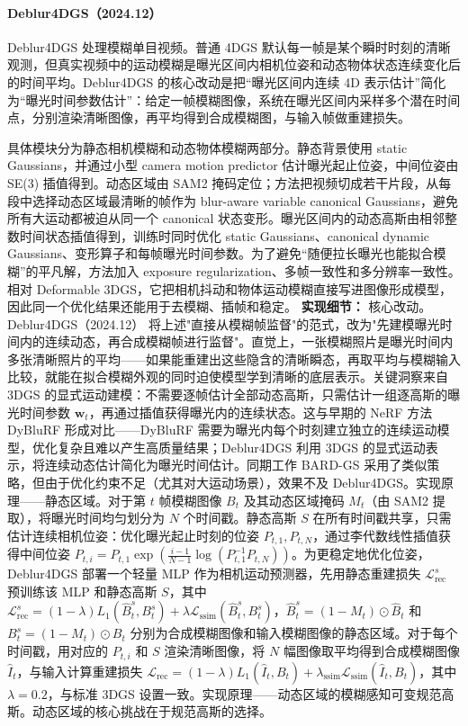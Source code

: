 \paragraph{Deblur4DGS（2024.12）\cite{2412_06424}}
Deblur4DGS 处理模糊单目视频。普通 4DGS 默认每一帧是某个瞬时时刻的清晰观测，但真实视频中的运动模糊是曝光区间内相机位姿和动态物体状态连续变化后的时间平均。Deblur4DGS 的核心改动是把“曝光区间内连续 4D 表示估计”简化为“曝光时间参数估计”：给定一帧模糊图像，系统在曝光区间内采样多个潜在时间点，分别渲染清晰图像，再平均得到合成模糊图，与输入帧做重建损失。

具体模块分为静态相机模糊和动态物体模糊两部分。静态背景使用 static Gaussians，并通过小型 camera motion predictor 估计曝光起止位姿，中间位姿由 SE(3) 插值得到。动态区域由 SAM2 掩码定位；方法把视频切成若干片段，从每段中选择动态区域最清晰的帧作为 blur-aware variable canonical Gaussians，避免所有大运动都被迫从同一个 canonical 状态变形。曝光区间内的动态高斯由相邻整数时间状态插值得到，训练时同时优化 static Gaussians、canonical dynamic Gaussians、变形算子和每帧曝光时间参数。为了避免“随便拉长曝光也能拟合模糊”的平凡解，方法加入 exposure regularization、多帧一致性和多分辨率一致性。相对 Deformable 3DGS，它把相机抖动和物体运动模糊直接写进图像形成模型，因此同一个优化结果还能用于去模糊、插帧和稳定。
\textbf{实现细节：} 核心改动。Deblur4DGS（2024.12） 将上述"直接从模糊帧监督"的范式，改为"先建模曝光时间内的连续动态，再合成模糊帧进行监督"。直觉上，一张模糊照片是曝光时间内多张清晰照片的平均——如果能重建出这些隐含的清晰瞬态，再取平均与模糊输入比较，就能在拟合模糊外观的同时迫使模型学到清晰的底层表示。关键洞察来自 3DGS 的显式运动建模：不需要逐帧估计全部动态高斯，只需估计一组逐高斯的曝光时间参数 $\mathbf{w}_t$，再通过插值获得曝光内的连续状态。这与早期的 NeRF 方法 DyBluRF 形成对比——DyBluRF 需要为曝光内每个时刻建立独立的连续运动模型，优化复杂且难以产生高质量结果；Deblur4DGS 利用 3DGS 的显式运动表示，将连续动态估计简化为曝光时间估计。同期工作 BARD-GS 采用了类似策略，但由于优化约束不足（尤其对大运动场景），效果不及 Deblur4DGS。实现原理——静态区域。对于第 $t$ 帧模糊图像 $B_t$ 及其动态区域掩码 $M_t$（由 SAM2 提取），将曝光时间均匀划分为 $N$ 个时间戳。静态高斯 $S$ 在所有时间戳共享，只需估计连续相机位姿：优化曝光起止时刻的位姿 $P_{t,1}, P_{t,N}$，通过李代数线性插值获得中间位姿 $P_{t,i} = P_{t,1} \exp(\frac{i-1}{N-1} \log(P_{t,1}^{-1}P_{t,N}))$。为更稳定地优化位姿，Deblur4DGS 部署一个轻量 MLP 作为相机运动预测器，先用静态重建损失 $\mathcal{L}_{\mathrm{rec}}^s$ 预训练该 MLP 和静态高斯 $S$，其中 $\mathcal{L}_{\mathrm{rec}}^s = (1-\lambda)L_1(\hat{B}_t^s, B_t^s) + \lambda\mathcal{L}_{\mathrm{ssim}}(\hat{B}_t^s, B_t^s)$，$\hat{B}_t^s = (1-M_t) \odot \hat{B}_t$ 和 $B_t^s = (1-M_t) \odot B_t$ 分别为合成模糊图像和输入模糊图像的静态区域。对于每个时间戳，用对应的 $P_{t,i}$ 和 $S$ 渲染清晰图像，将 $N$ 幅图像取平均得到合成模糊图像 $\hat{I}_t$，与输入计算重建损失 $\mathcal{L}_{\mathrm{rec}} = (1-\lambda)L_1(\hat{I}_t, B_t) + \lambda_{\mathrm{ssim}}\mathcal{L}_{\mathrm{ssim}}(\hat{I}_t, B_t)$，其中 $\lambda=0.2$，与标准 3DGS 设置一致。实现原理——动态区域的模糊感知可变规范高斯。动态区域的核心挑战在于规范高斯的选择。
